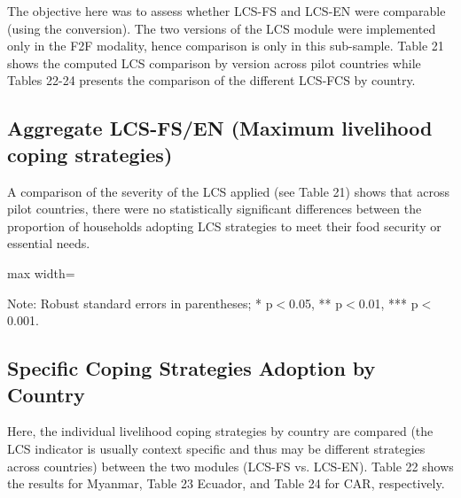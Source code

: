 \documentclass[11pt,harvard]{article}
\begin{document}
The objective here was to assess whether LCS-FS and LCS-EN were comparable (using the conversion). The two versions of the LCS module were implemented only in the F2F modality, hence comparison is only in this sub-sample. Table 21 shows the computed LCS comparison by version across pilot countries while Tables 22-24 presents the comparison of the different LCS-FCS by country.
	
	
\subsection{Aggregate LCS-FS/EN (Maximum livelihood coping strategies)}
	
A comparison of the severity of the LCS applied (see Table 21) shows that across pilot countries, there were no statistically significant differences between the proportion of households adopting LCS strategies to meet their food security or essential needs. 
	
	\begin{table}[htbp]
		\centering
		\begin{adjustbox}{max width=\textwidth}
			\begin{threeparttable}
				\caption{Myanmar: LCS for Essential Needs vs. Food Security}
				\scriptsize
				 
				\label{tab:LCS_F2F_EN_FS_All_Country}
				\begin{tablenotes}
					\item Note: Robust standard errors in parentheses; * p$<$0.05, ** p$<$0.01, *** p$<$0.001. 
				\end{tablenotes}
			\end{threeparttable}
		\end{adjustbox}
	\end{table}
	
	
\pagebreak
	
\subsection{Specific Coping Strategies Adoption by Country}
	
Here, the individual livelihood coping strategies  by country are compared (the LCS indicator is usually context specific and thus may be different strategies across countries) between the two modules (LCS-FS vs. LCS-EN). Table 22 shows the results for Myanmar, Table 23 Ecuador, and Table 24 for CAR, respectively.
	
\end{document}

